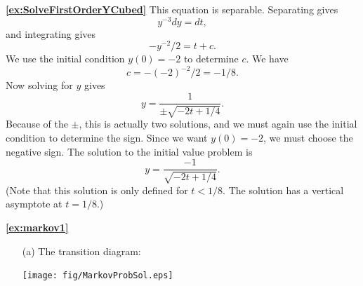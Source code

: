 \documentclass[reqno]{immbook}
\numberwithin{equation}{chapter}
\numberwithin{question}{section}
\numberwithin{theorem}{chapter}
\numberwithin{figure}{chapter}
\theoremstyle{definition}
\begin{document}
\medskip
\textbf{\ref{ex:SolveFirstOrderYCubed}}
This equation is separable.  Separating gives
\[
   y^{-3}dy = dt,
\]
and integrating gives
\[
  -y^{-2}/2 = t + c.
\]
We use the initial condition $y(0)=-2$ to determine $c$.
We have
\[
  c = -(-2)^{-2}/2 = -1/8.
\]
Now solving for $y$ gives
\[
  y = \frac{1}{\pm\sqrt{-2t+1/4}}.
\]
Because of the $\pm$, this is actually two solutions, and we must again use
the initial condition to determine the sign.  Since we want $y(0)=-2$, we must
choose the negative sign.  The solution to the initial value problem is
\[
  y = \frac{-1}{\sqrt{-2t+1/4}}.
\]
(Note that this solution is only defined for $t < 1/8$.  The
solution has a vertical asymptote at $t=1/8$.)

\newpage
\textbf{\ref{ex:markov1}}
\begin{enumerate}
\item[(a)] The transition diagram:

\medskip
\centerline{%
\texttt{[image: fig/MarkovProbSol.eps]}
}
\medskip


\end{enumerate}
\end{document}
